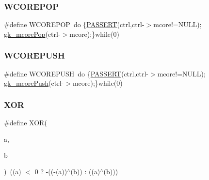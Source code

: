 \subsubsection{\texorpdfstring{W\+C\+O\+R\+E\+P\+OP}{WCOREPOP}}
{\footnotesize\ttfamily \#define W\+C\+O\+R\+E\+P\+OP~do \{\hyperlink{a00924_a9702c21c10bbf405ed280d84651f379b}{P\+A\+S\+S\+E\+RT}(ctrl,ctrl-\/$>$mcore!=N\+U\+LL); \hyperlink{a00107_ac7b3189a2be11b6736dc4c27d3d30f3a}{gk\+\_\+mcore\+Pop}(ctrl-\/$>$mcore);\}while(0)}

\mbox{\label{a00924_a76445c109da4a1f7bdf538f71922446b}} 
\subsubsection{\texorpdfstring{W\+C\+O\+R\+E\+P\+U\+SH}{WCOREPUSH}}
{\footnotesize\ttfamily \#define W\+C\+O\+R\+E\+P\+U\+SH~do \{\hyperlink{a00924_a9702c21c10bbf405ed280d84651f379b}{P\+A\+S\+S\+E\+RT}(ctrl,ctrl-\/$>$mcore!=N\+U\+LL); \hyperlink{a00107_a07579694837248c1f2908860edc643c0}{gk\+\_\+mcore\+Push}(ctrl-\/$>$mcore);\}while(0)}

\mbox{\label{a00924_af68c93838d750937b129e406f849ed94}} 
\subsubsection{\texorpdfstring{X\+OR}{XOR}}
{\footnotesize\ttfamily \#define X\+OR(\begin{DoxyParamCaption}\item[{}]{a,  }\item[{}]{b }\end{DoxyParamCaption})~((a) $<$ 0 ? -\/((-\/(a))$^\wedge$(b)) \+: ((a)$^\wedge$(b)))}

